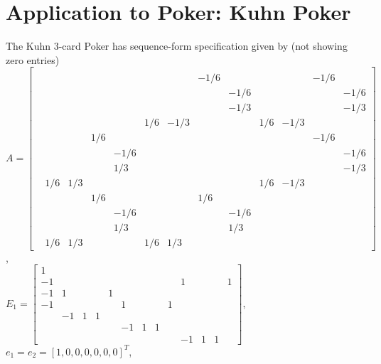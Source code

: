 \documentclass{article} %
\begin{document}
\section{Application to Poker: Kuhn Poker}
\label{sec:kuhn}
The Kuhn 3-card Poker has sequence-form specification given by (not showing zero entries)\\
$A = \left[\begin{array}{ccccccccccccc}
  &   &   &   &   &   &   &   &   &   &   &   &  \\
  &   &   &   &   &   &   & -1 / 6 &   &   &   & -1 / 6 &  \\
  &   &   &   &   &   &   &   & -1 / 6 &   &   &   & -1 / 6\\
  &   &   &   &   &   &   &   & -1 / 3 &   &   &   & -1 / 3\\
  &   &   &   &   & 1 / 6 & -1 / 3 &   &   & 1 / 6 & -1 / 3 &   &  \\
  &   &   & 1 / 6 &   &   &   &   &   &   &   & -1 / 6 &  \\
  &   &   &   & -1 / 6 &   &   &   &   &   &   &   & -1 / 6\\
  &   &   &   & 1 / 3 &   &   &   &   &   &   &   & -1 / 3\\
  & 1 / 6 & 1 / 3 &   &   &   &   &   &   & 1 / 6 & -1 / 3 &   &  \\
  &   &   & 1 / 6 &   &   &   & 1 / 6 &   &   &   &   &  \\
  &   &   &   & -1 / 6 &   &   &   & -1 / 6 &   &   &   &  \\
  &   &   &   & 1 / 3 &   &   &   & 1 / 3 &   &   &   &  \\
  & 1 / 6 & 1 / 3 &   &   & 1 / 6 & 1 / 3 &   &   &   &   &   &  
\end{array}\right]$,\\
$E_1 = \left[\begin{array}{ccccccccccccc}
1 &   &   &   &   &   &   &   &   &   &   &   &  \\
-1 &   &   &   &   &   &   &   &   & 1 &   &   & 1\\
-1 & 1 &   &   & 1 &   &   &   &   &   &   &   &  \\
-1 &   &   &   &   & 1 &   &   & 1 &   &   &   &  \\
  & -1 & 1 & 1 &   &   &   &   &   &   &   &   &  \\
  &   &   &   &   & -1 & 1 & 1 &   &   &   &   &  \\
  &   &   &   &   &   &   &   &   & -1 & 1 & 1 &  
\end{array}\right]$, $e_1 = e_2 = [1, 0, 0, 0, 0, 0, 0]^T$,\\
\end{document}
